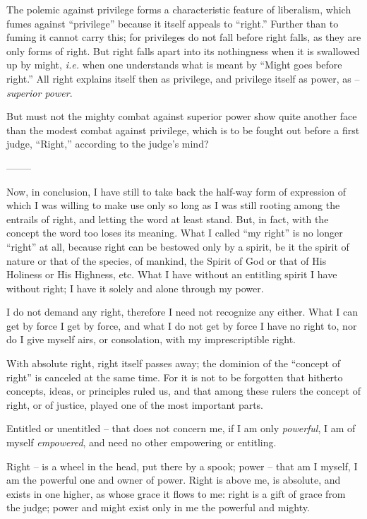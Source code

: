 The polemic against privilege forms a characteristic feature of liberalism, 
which fumes against ``privilege'' because it itself appeals to ``right.'' 
Further than to fuming it cannot carry this; for privileges do not fall before 
right falls, as they are only forms of right. But right falls apart into its 
nothingness when it is swallowed up by might, \textit{i.e.} when one 
understands what is meant by ``Might goes before right.'' All right explains 
itself then as privilege, and privilege itself as power, as -- 
\textit{superior power}.

But must not the mighty combat against superior power show quite another face 
than the modest combat against privilege, which is to be fought out before a 
first judge, ``Right,'' according to the judge's mind?

\begin{center}
--------\end{center}


Now, in conclusion, I have still to take back the half-way form of expression 
of which I was willing to make use only so long as I was still rooting among 
the entrails of right, and letting the word at least stand. But, in fact, with 
the concept the word too loses its meaning. What I called ``my right'' is no 
longer ``right'' at all, because right can be bestowed only by a spirit, be 
it the spirit of nature or that of the species, of mankind, the Spirit of God 
or that of His Holiness or His Highness, etc. What I have without an entitling 
spirit I have without right; I have it solely and alone through my power.

I do not demand any right, therefore I need not recognize any either. What I 
can get by force I get by force, and what I do not get by force I have no 
right to, nor do I give myself airs, or consolation, with my imprescriptible 
right.

With absolute right, right itself passes away; the dominion of the ``concept 
of right'' is canceled at the same time. For it is not to be forgotten that 
hitherto concepts, ideas, or principles ruled us, and that among these rulers 
the concept of right, or of justice, played one of the most important parts.

Entitled or unentitled -- that does not concern me, if I am only 
\textit{powerful}, I am of myself \textit{empowered}, and need no other 
empowering or entitling.

Right -- is a wheel in the head, put there by a spook; power -- that am I 
myself, I am the powerful one and owner of power. Right is above me, is 
absolute, and exists in one higher, as whose grace it flows to me: right is a 
gift of grace from the judge; power and might exist only in me the powerful 
and mighty.

